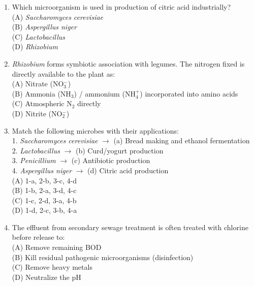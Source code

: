 \documentclass{article}
\begin{document}
\begin{enumerate}[label=Q\arabic*.]
\item Which microorganism is used in production of citric acid industrially?
\\(A) \textit{Saccharomyces cerevisiae}
\\(B) \textit{Aspergillus niger}
\\(C) \textit{Lactobacillus}
\\(D) \textit{Rhizobium}

\item \textit{Rhizobium} forms symbiotic association with legumes. The nitrogen fixed is directly available to the plant as:
\\(A) Nitrate (NO$_3^-$)
\\(B) Ammonia (NH$_3$) / ammonium (NH$_4^+$) incorporated into amino acids
\\(C) Atmospheric N$_2$ directly
\\(D) Nitrite (NO$_2^-$)

\item Match the following microbes with their applications:\\
1. \textit{Saccharomyces cerevisiae} $\rightarrow$ (a) Bread making and ethanol fermentation\\
2. \textit{Lactobacillus} $\rightarrow$ (b) Curd/yogurt production\\
3. \textit{Penicillium} $\rightarrow$ (c) Antibiotic production\\
4. \textit{Aspergillus niger} $\rightarrow$ (d) Citric acid production
\\(A) 1-a, 2-b, 3-c, 4-d
\\(B) 1-b, 2-a, 3-d, 4-c
\\(C) 1-c, 2-d, 3-a, 4-b
\\(D) 1-d, 2-c, 3-b, 4-a

\item The effluent from secondary sewage treatment is often treated with chlorine before release to:
\\(A) Remove remaining BOD
\\(B) Kill residual pathogenic microorganisms (disinfection)
\\(C) Remove heavy metals
\\(D) Neutralize the pH

\end{enumerate}
\end{document}
